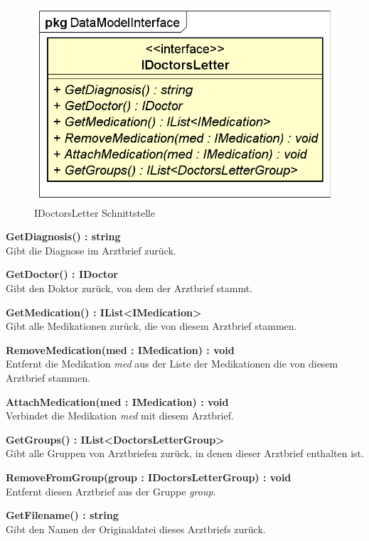 \documentclass[a4paper]{scrreprt}
\begin{document}
\begin{figure}[H]
\centering
\includegraphics[width=0.55\textheight]{graphics/Klassendiagramme/Model/IDoctorsLetter.png}
\caption{IDoctorsLetter Schnittstelle}
\end{figure}
\textbf{GetDiagnosis() : string}\\
Gibt die Diagnose im Arztbrief zurück.

\textbf{GetDoctor() : IDoctor}\\
Gibt den Doktor zurück, von dem der Arztbrief stammt.

\textbf{GetMedication() : IList<IMedication>}\\
Gibt alle Medikationen zurück, die von diesem Arztbrief stammen.

\textbf{RemoveMedication(med : IMedication) : void}\\
Entfernt die Medikation \textit{med} aus der Liste der Medikationen die von diesem Arztbrief stammen.

\textbf{AttachMedication(med : IMedication) : void}\\
Verbindet die Medikation \textit{med} mit diesem Arztbrief.

\textbf{GetGroups() : IList<DoctorsLetterGroup>}\\
Gibt alle Gruppen von Arztbriefen zurück, in denen dieser Arztbrief enthalten ist.

\textbf{RemoveFromGroup(group : IDoctorsLetterGroup) : void}\\
Entfernt diesen Arztbrief aus der Gruppe \textit{group}.

\textbf{GetFilename() : string}\\
Gibt den Namen der Originaldatei dieses Arztbriefs zurück.
\end{document}
